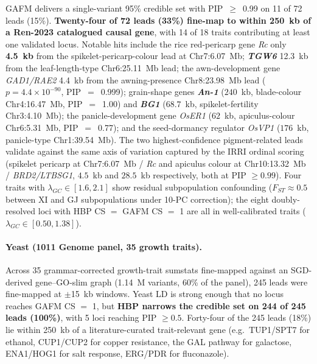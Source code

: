 GAFM delivers a single-variant 95\% credible set with PIP~$\geq$~0.99
on 11 of 72 leads (15\%). \textbf{Twenty-four of 72 leads (33\%)
fine-map to within 250~kb of a Ren-2023 catalogued causal gene}, with
14 of 18 traits contributing at least one validated locus. Notable
hits include the rice red-pericarp gene \emph{Rc} only \textbf{4.5~kb}
from the spikelet-pericarp-colour lead at Chr7:6.07~Mb;
\textbf{\emph{TGW6}} 12.3~kb from the leaf-length-type Chr6:25.11~Mb
lead; the awn-development gene \emph{GAD1/RAE2} 4.4~kb from the
awning-presence Chr8:23.98~Mb lead ($p=4.4\times10^{-90}$,
PIP~$=$~0.999); grain-shape genes \textbf{\emph{An-1}}
($240$~kb, blade-colour Chr4:16.47~Mb, PIP~$=$~1.00) and
\textbf{\emph{BG1}} ($68.7$~kb, spikelet-fertility Chr3:4.10~Mb);
the panicle-development gene \emph{OsER1} ($62$~kb,
apiculus-colour Chr6:5.31~Mb, PIP~$=$~0.77); and the seed-dormancy
regulator \emph{OsVP1} ($176$~kb, panicle-type Chr1:39.54~Mb).
The two highest-confidence pigment-related leads validate against
the same axis of variation captured by the IRRI ordinal scoring
(spikelet pericarp at Chr7:6.07~Mb / \emph{Rc} and apiculus colour
at Chr10:13.32~Mb / \emph{BRD2/LTBSG1}, $4.5$~kb and $28.5$~kb
respectively, both at PIP $\geq 0.99$). Four traits with
$\lambda_{GC} \in [1.6, 2.1]$ show residual subpopulation
confounding ($F_{ST} \approx 0.5$ between XI and GJ subpopulations
under 10-PC correction); the eight doubly-resolved loci with
HBP CS $=$ GAFM CS $=$ 1 are all in well-calibrated traits
($\lambda_{GC} \in [0.50, 1.38]$).

\paragraph{Yeast (1011 Genome panel, 35 growth traits).}
Across 35 grammar-corrected growth-trait sumstats\cite{peter2018genome,
bloom2015genetic} fine-mapped against an SGD-derived
gene--GO-slim graph (1.14~M variants, 60\% of the panel), 245 leads
were fine-mapped at $\pm$15~kb windows. Yeast LD is strong enough that
no locus reaches GAFM CS $=$ 1, but \textbf{HBP narrows the credible
set on 244 of 245 leads (100\%)}, with 5 loci reaching PIP $\geq 0.5$.
Forty-four of the 245 leads (18\%) lie within 250~kb of a
literature-curated trait-relevant gene (e.g.\ TUP1/SPT7 for ethanol,
CUP1/CUP2 for copper resistance, the GAL pathway for galactose,
ENA1/HOG1 for salt response, ERG/PDR for fluconazole).

